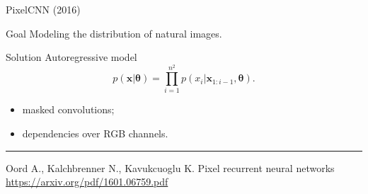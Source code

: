 \documentclass{beamer}
\newcommand{\bx}{\mathbf{x}}
\newcommand{\btheta}{\boldsymbol{\theta}}
\begin{document}
\begin{frame}{PixelCNN (2016)}
\begin{block}{Goal}
Modeling the distribution of natural images.
\end{block}
\begin{block}{Solution}
Autoregressive model
\[
    p(\bx | \btheta) = \prod_{i=1}^{n^2} p(x_i|\bx_{1:i-1}, \btheta).
\]
\begin{itemize}
    \item masked convolutions;
    \item dependencies over RGB channels.
\end{itemize}
\end{block}
\vfill
\hrule\medskip
{\scriptsize Oord A., Kalchbrenner N., Kavukcuoglu K. Pixel recurrent neural networks \href{https://arxiv.org/pdf/1601.06759.pdf}{https://arxiv.org/pdf/1601.06759.pdf}}
\end{frame}
\end{document}
